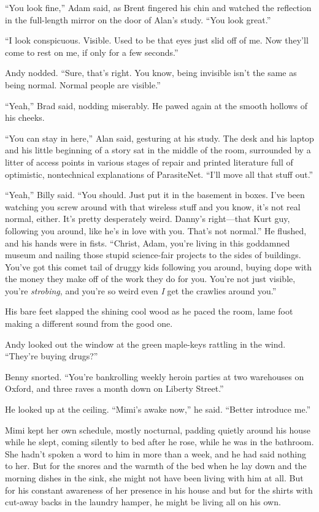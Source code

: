 ``You look fine,'' Adam said, as Brent fingered his chin and watched
the reflection in the full-length mirror on the door of Alan's study. 
``You look great.''

``I look conspicuous.  Visible.  Used to be that eyes just slid off of
me.  Now they'll come to rest on me, if only for a few seconds.''

Andy nodded.  ``Sure, that's right.  You know, being invisible isn't
the same as being normal.  Normal people are visible.''

``Yeah,'' Brad said, nodding miserably.  He pawed again at the smooth
hollows of his cheeks.

``You can stay in here,'' Alan said, gesturing at his study.  The desk
and his laptop and his little beginning of a story sat in the middle
of the room, surrounded by a litter of access points in various stages
of repair and printed literature full of optimistic, nontechnical
explanations of ParasiteNet.  ``I'll move all that stuff out.''

``Yeah,'' Billy said.  ``You should.  Just put it in the basement in
boxes.  I've been watching you screw around with that wireless stuff
and you know, it's not real normal, either.  It's pretty desperately
weird.  Danny's right---that Kurt guy, following you around, like he's
in love with you.  That's not normal.'' He flushed, and his hands were
in fists.  ``Christ, Adam, you're living in this goddamned museum and
nailing those stupid science-fair projects to the sides of buildings. 
You've got this comet tail of druggy kids following you around, buying
dope with the money they make off of the work they do for you.  You're
not just visible, you're \textit{strobing}, and you're so weird even
\textit{I} get the crawlies around you.''

His bare feet slapped the shining cool wood as he paced the room, lame
foot making a different sound from the good one.

Andy looked out the window at the green maple-keys rattling in the
wind.  ``They're buying drugs?''

Benny snorted.  ``You're bankrolling weekly heroin parties at two
warehouses on Oxford, and three raves a month down on Liberty
Street.''

He looked up at the ceiling.  ``Mimi's awake now,'' he said.  ``Better
introduce me.''

Mimi kept her own schedule, mostly nocturnal, padding quietly around
his house while he slept, coming silently to bed after he rose, while
he was in the bathroom.  She hadn't spoken a word to him in more than
a week, and he had said nothing to her.  But for the snores and the
warmth of the bed when he lay down and the morning dishes in the sink,
she might not have been living with him at all.  But for his constant
awareness of her presence in his house and but for the shirts with
cut-away backs in the laundry hamper, he might be living all on his
own.


